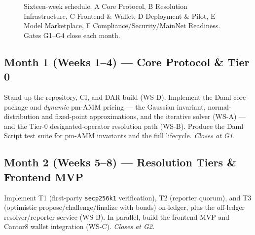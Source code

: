 \documentclass[11pt,a4paper]{article}
\begin{document}
\begin{figure}[h]
\centering
{}
\caption{Sixteen-week schedule. A Core Protocol, B Resolution Infrastructure, C Frontend \& Wallet, D Deployment \& Pilot, E Model Marketplace, F Compliance/Security/MainNet Readiness. Gates G1--G4 close each month.}
\end{figure}

\subsection*{Month 1 (Weeks 1--4) --- Core Protocol \& Tier 0}
Stand up the repository, CI, and DAR build (WS-D). Implement the Daml core package and \emph{dynamic} pm-AMM pricing --- the Gaussian invariant, normal-distribution and fixed-point approximations, and the iterative solver (WS-A) --- and the Tier-0 designated-operator resolution path (WS-B). Produce the Daml Script test suite for pm-AMM invariants and the full lifecycle. \emph{Closes at G1.}

\subsection*{Month 2 (Weeks 5--8) --- Resolution Tiers \& Frontend MVP}
Implement T1 (first-party \texttt{secp256k1} verification), T2 (reporter quorum), and T3 (optimistic propose/challenge/finalize with bonds) on-ledger, plus the off-ledger resolver/reporter service (WS-B). In parallel, build the frontend MVP and Cantor8 wallet integration (WS-C). \emph{Closes at G2.}
\end{document}
